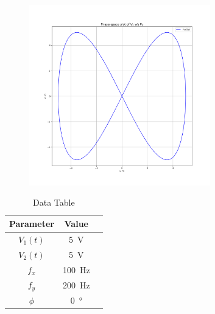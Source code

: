 \documentclass[a4paper,12pt]{article}
\begin{document}
\begin{figure}[htbp]
\begin{center}
    \includegraphics[width=0.7\textwidth]{figs/4/pplot.png}
\end{center}
\end{figure}


\begin{table}[htbp]
    \centering
    \begin{tabular}{|c|c|c|}
        \hline
        \textbf{Parameter} & \textbf{Value} \\
        \hline
        $V_1(t)$ & \SI{5}{\volt} \\
        $V_2(t)$ & \SI{5}{\volt} \\
        $f_x$ & \SI{100}{\hertz} \\
        $f_y$ & \SI{200}{\hertz} \\
        $\phi$ & \SI{0}{\degree} \\
        \hline
    \end{tabular}
    \caption{Data Table}
    \label{tab:sample}
\end{table}
\end{document}
